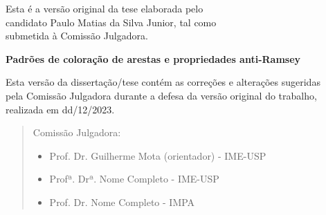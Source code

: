 \documentclass[12pt,a4paper]{book}
\begin{document}
    \vskip 2cm

    \begin{flushright}
	Esta é a versão original da tese elaborada pelo\\
	candidato Paulo Matias da Silva Junior, tal como \\
	submetida à Comissão Julgadora.
    \end{flushright}

\pagebreak

%
%
%
%
\newpage
\thispagestyle{empty}
    \begin{center}
        \vspace*{2.3 cm}
        \textbf{\Large{Padrões de coloração de arestas e propriedades anti-Ramsey }}\\
        \vspace*{2 cm}
    \end{center}

    \vskip 2cm

    \begin{flushright}
	Esta versão da dissertação/tese contém as correções e alterações sugeridas\\
	pela Comissão Julgadora durante a defesa da versão original do trabalho,\\
	realizada em dd/12/2023.

    \vskip 2cm

    \end{flushright}
    \vskip 4.2cm

    \begin{quote}
    \noindent Comissão Julgadora:
    
    \begin{itemize}
		\item Prof. Dr. Guilherme Mota (orientador) - IME-USP 
		\item Profª. Drª. Nome Completo - IME-USP %
		\item Prof. Dr. Nome Completo - IMPA %
    \end{itemize}
      
    \end{quote}
\pagebreak
\end{document}
